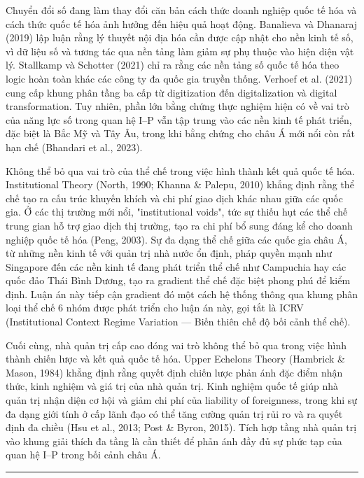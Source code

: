 \documentclass[12pt,a4paper]{article}
\begin{document}
Chuyển đổi số đang làm thay đổi căn bản cách thức doanh nghiệp quốc tế
hóa và cách thức quốc tế hóa ảnh hưởng đến hiệu quả hoạt động. Banalieva
và Dhanaraj (2019) lập luận rằng lý thuyết nội địa hóa cần được cập nhật
cho nền kinh tế số, vì dữ liệu số và tương tác qua nền tảng làm giảm sự
phụ thuộc vào hiện diện vật lý. Stallkamp và Schotter (2021) chỉ ra rằng
các nền tảng số quốc tế hóa theo logic hoàn toàn khác các công ty đa
quốc gia truyền thống. Verhoef et al. (2021) cung cấp khung phân tầng ba
cấp từ digitization đến digitalization và digital transformation. Tuy
nhiên, phần lớn bằng chứng thực nghiệm hiện có về vai trò của năng lực
số trong quan hệ I--P vẫn tập trung vào các nền kinh tế phát triển, đặc
biệt là Bắc Mỹ và Tây Âu, trong khi bằng chứng cho châu Á mới nổi còn
rất hạn chế (Bhandari et al., 2023).

Không thể bỏ qua vai trò của thể chế trong việc hình thành kết quả quốc
tế hóa. Institutional Theory (North, 1990; Khanna \& Palepu, 2010) khẳng
định rằng thể chế tạo ra cấu trúc khuyến khích và chi phí giao dịch khác
nhau giữa các quốc gia. Ở các thị trường mới nổi, "institutional voids",
tức sự thiếu hụt các thể chế trung gian hỗ trợ giao dịch thị trường, tạo
ra chi phí bổ sung đáng kể cho doanh nghiệp quốc tế hóa (Peng, 2003). Sự
đa dạng thể chế giữa các quốc gia châu Á, từ những nền kinh tế với quản
trị nhà nước ổn định, pháp quyền mạnh như Singapore đến các nền kinh tế
đang phát triển thể chế như Campuchia hay các quốc đảo Thái Bình Dương,
tạo ra gradient thể chế đặc biệt phong phú để kiểm định. Luận án này
tiếp cận gradient đó một cách hệ thống thông qua khung phân loại thể chế
6 nhóm được phát triển cho luận án này, gọi tắt là ICRV (Institutional
Context Regime Variation --- Biến thiên chế độ bối cảnh thể chế).

Cuối cùng, nhà quản trị cấp cao đóng vai trò không thể bỏ qua trong việc
hình thành chiến lược và kết quả quốc tế hóa. Upper Echelons Theory
(Hambrick \& Mason, 1984) khẳng định rằng quyết định chiến lược phản ánh
đặc điểm nhận thức, kinh nghiệm và giá trị của nhà quản trị. Kinh nghiệm
quốc tế giúp nhà quản trị nhận diện cơ hội và giảm chi phí của liability
of foreignness, trong khi sự đa dạng giới tính ở cấp lãnh đạo có thể
tăng cường quản trị rủi ro và ra quyết định đa chiều (Hsu et al., 2013;
Post \& Byron, 2015). Tích hợp tầng nhà quản trị vào khung giải thích đa
tầng là cần thiết để phản ánh đầy đủ sự phức tạp của quan hệ I--P trong
bối cảnh châu Á.

\begin{center}\rule{0.5\linewidth}{0.5pt}\end{center}
\end{document}

